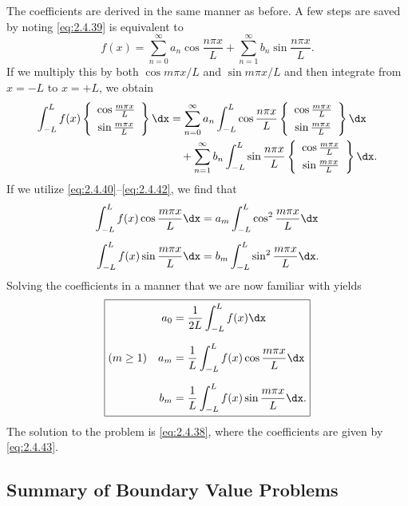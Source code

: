 The coefficients are derived in the same manner as before. A few steps are saved by noting \eqref{eq:2.4.39} is equivalent to
\[
f(x) = \sum_{n=0}^{\infty} a_n\cos\frac{n\pi x}{L} + \sum_{n=1}^{\infty} b_n\sin\frac{n\pi x}{L}.
\]
If we multiply this by both $\cos m\pi x/L$ and $\sin m\pi x/L$ and then integrate from $x = -L$ to $x = +L$, we obtain
\begin{align*}
\int_{-L}^{L} f(x)\left\{\begin{array}{c}\cos\frac{m\pi x}{L} \\[4pt] \sin\frac{m\pi x}{L}\end{array}\right\}\dx &= \sum_{n=0}^{\infty} a_n\int_{-L}^{L}\cos\frac{n\pi x}{L}\left\{\begin{array}{c}\cos\frac{m\pi x}{L} \\[4pt] \sin\frac{m\pi x}{L}\end{array}\right\}\dx \\
&\quad+ \sum_{n=1}^{\infty} b_n\int_{-L}^{L}\sin\frac{n\pi x}{L}\left\{\begin{array}{c}\cos\frac{m\pi x}{L} \\[4pt] \sin\frac{m\pi x}{L}\end{array}\right\}\dx.
\end{align*}
If we utilize \eqref{eq:2.4.40}--\eqref{eq:2.4.42}, we find that
\begin{align*}
\int_{-L}^{L} f(x)\cos\frac{m\pi x}{L}\dx &= a_m\int_{-L}^{L}\cos^2\frac{m\pi x}{L}\dx \\[4pt]
\int_{-L}^{L} f(x)\sin\frac{m\pi x}{L}\dx &= b_m\int_{-L}^{L}\sin^2\frac{m\pi x}{L}\dx.
\end{align*}
Solving the coefficients in a manner that we are now familiar with yields
\begin{equation}
\label{eq:2.4.43}
\boxed{\begin{aligned}
a_0 &= \frac{1}{2L}\int_{-L}^{L} f(x)\dx \\[6pt]
(m \ge 1)\quad a_m &= \frac{1}{L}\int_{-L}^{L} f(x)\cos\frac{m\pi x}{L}\dx \\[6pt]
b_m &= \frac{1}{L}\int_{-L}^{L} f(x)\sin\frac{m\pi x}{L}\dx.
\end{aligned}}
\end{equation}
The solution to the problem is \eqref{eq:2.4.38}, where the coefficients are given by \eqref{eq:2.4.43}.

\subsection{Summary of Boundary Value Problems}
\label{sec:2.4.3}


